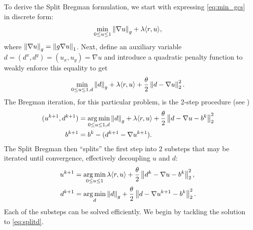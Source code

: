 To derive the Split Bregman formulation, we start with expressing \eqref{eq:min_gcs} in discrete form: 
\begin{align*}
\min_{0\leq u \leq 1} \left\lVert \nabla u \right\rVert_g + \lambda \langle r, u \rangle,
\end{align*}
where $\left\lVert \nabla u \right\rVert_g = \left\lVert g \nabla u\right\rVert_1$. Next, 
define an auxiliary variable $d = (d^x, d^y) = (u_x, u_y) = \nabla u$ and introduce a quadratic penalty function to weakly enforce this equality to get
\begin{align*}
\min_{0\leq u \leq 1, d} 
 \left\lVert d \right\rVert_g + \lambda  \langle r, u \rangle
+ \frac{\theta}{2} \left\lVert d - \nabla u \right\rVert_2^2.
\end{align*} 
The Bregman iteration, for this particular problem, is the 2-step procedure (see \cite[Theorem 2.2.]{goldstein2009split})
\begin{align}
(u^{k+1}, d^{k+1}) 
&= \operatorname*{arg\,min}_{0\leq u \leq 1, d}  \left\lVert d\right\rVert_g + \lambda\langle r, u \rangle + \frac{\theta}{2} \left\lVert d - \nabla u - b^k \right\rVert^2_2 
\\
b^{k+1} &= b^k - (d^{k+1} - \nabla u^{k+1}) .
\label{eq:sbbij}
\end{align} 
The Split Bregman then ``splits'' the first step into 2 substeps that may be iterated until convergence, effectively decoupling $u$ and $d$: 
\begin{align}
u^{k+1} &= \operatorname*{arg\,min}_{0\leq u \leq 1} \lambda \langle r, u \rangle
+ \frac{\theta}{2} \left\lVert d^k - \nabla u - b^k \right\rVert^2_2,
\label{eq:splitu}
\\
d^{k+1} 
&= \operatorname*{arg\,min}_d \left\lVert d\right\rVert_g + \frac{\theta}{2} \left\lVert d - \nabla u^{k+1} - b^k\right\rVert^2_2.
\label{eq:splitd}
\end{align}
Each of the substeps can be solved efficiently. We begin by tackling the solution to \eqref{eq:splitd}.

